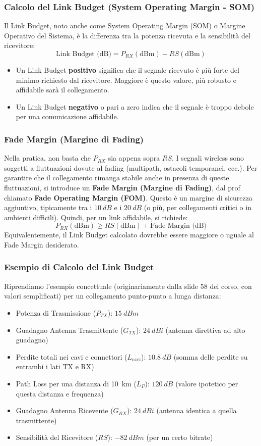 \subsubsection{Calcolo del Link Budget (System Operating Margin - SOM)}
Il Link Budget, noto anche come System Operating Margin (SOM) o Margine Operativo del Sistema, è la differenza tra la potenza ricevuta e la sensibilità del ricevitore:
\[ \text{Link Budget (dB)} = P_{RX} (\text{dBm}) - RS (\text{dBm}) \]
\begin{itemize}
    \item Un Link Budget \textbf{positivo} significa che il segnale ricevuto è più forte del minimo richiesto dal ricevitore. Maggiore è questo valore, più robusto e affidabile sarà il collegamento.
    \item Un Link Budget \textbf{negativo} o pari a zero indica che il segnale è troppo debole per una comunicazione affidabile.
\end{itemize}

\subsubsection{Fade Margin (Margine di Fading)}
Nella pratica, non basta che $P_{RX}$ sia appena sopra $RS$. I segnali wireless sono soggetti a fluttuazioni dovute al fading (multipath, ostacoli temporanei, ecc.). Per garantire che il collegamento rimanga stabile anche in presenza di queste fluttuazioni, si introduce un \textbf{Fade Margin (Margine di Fading)}, dal prof chiamato \textbf{Fade Operating Margin (FOM)}.
Questo è un margine di sicurezza aggiuntivo, tipicamente tra i $\SI{10}{dB}$ e i $\SI{20}{dB}$ (o più, per collegamenti critici o in ambienti difficili).
Quindi, per un link affidabile, si richiede:
\[ P_{RX} (\text{dBm}) \ge RS (\text{dBm}) + \text{Fade Margin (dB)} \]
Equivalentemente, il Link Budget calcolato dovrebbe essere maggiore o uguale al Fade Margin desiderato.

\subsubsection{Esempio di Calcolo del Link Budget}
Riprendiamo l'esempio concettuale (originariamente dalla slide 58 del corso, con valori semplificati) per un collegamento punto-punto a lunga distanza:
\begin{itemize}
    \item Potenza di Trasmissione ($P_{TX}$): $\SI{+15}{dBm}$
    \item Guadagno Antenna Trasmittente ($G_{TX}$): $\SI{+24}{dBi}$ (antenna direttiva ad alto guadagno)
    \item Perdite totali nei cavi e connettori ($L_{\text{cavi}}$): $\SI{10.8}{dB}$ (somma delle perdite su entrambi i lati TX e RX)
    \item Path Loss per una distanza di \SI{10}{km} ($L_P$): $\SI{120}{dB}$ (valore ipotetico per questa distanza e frequenza)
    \item Guadagno Antenna Ricevente ($G_{RX}$): $\SI{+24}{dBi}$ (antenna identica a quella trasmittente)
    \item Sensibilità del Ricevitore ($RS$): $\SI{-82}{dBm}$ (per un certo bitrate)
\end{itemize}

